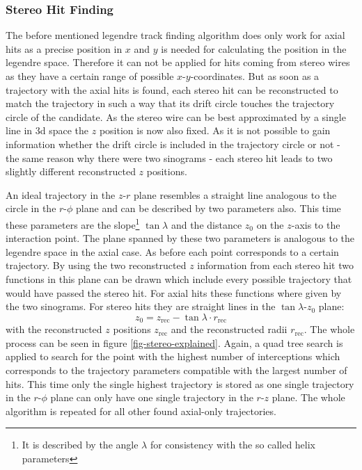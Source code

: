 \subsubsection{Stereo Hit Finding}

The before mentioned legendre track finding algorithm does only work for axial hits as a precise position in $x$ and $y$ is needed for calculating the position in the legendre space. Therefore it can not be applied for hits coming from stereo wires as they have a certain range of possible $x$-$y$-coordinates. But as soon as a trajectory with the axial hits is found, each stereo hit can be reconstructed to match the trajectory in such a way that its drift circle touches the trajectory circle of the candidate. As the stereo wire can be best approximated by a single line in 3d space the $z$ position is now also fixed. As it is not possible to gain information whether the drift circle is included in the trajectory circle or not - the same reason why there were two sinograms - each stereo hit leads to two slightly different reconstructed $z$ positions.

An ideal trajectory in the $z$-$r$ plane resembles a straight line analogous to the circle in the $r$-$\phi$ plane and can be described by two parameters also. This time these parameters are the slope\footnote{It is described by the angle $\lambda$ for consistency with the so called helix parameters} $\tan \lambda$ and the distance $z_0$ on the $z$-axis to the interaction point. The plane spanned by these two parameters is analogous to the legendre space in the axial case. As before each point corresponds to a certain trajectory. By using the two reconstructed $z$ information from each stereo hit two functions in this plane can be drawn which include every possible trajectory that would have passed the stereo hit. For axial hits these functions where given by the two sinograms. For stereo hits they are straight lines in the $\tan \lambda$-$z_0$ plane:
$$ z_0 = z_\text{rec} - \tan \lambda \cdot r_\text{rec} $$
with the reconstructed $z$ positions $z_\text{rec}$ and the reconstructed radii $r_\text{rec}$. The whole process can be seen in figure \ref{fig-stereo-explained}. Again, a quad tree search is applied to search for the point with the highest number of interceptions which corresponds to the trajectory parameters compatible with the largest number of hits. This time only the single highest trajectory is stored as one single trajectory in the $r$-$\phi$ plane can only have one single trajectory in the $r$-$z$ plane. The whole algorithm is repeated for all other found axial-only trajectories. 

